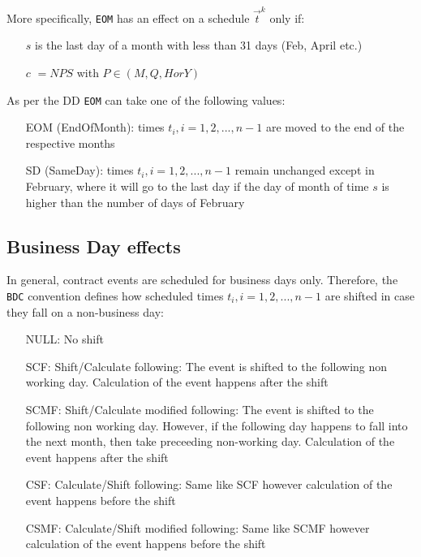 \documentclass[9pt,oneside]{amsart}
\newcommand{\attr}[1]{\texttt{#1}}
\begin{document}
\begin{multicols}{2}
More specifically, \attr{EOM} has an effect on a schedule $\vec{t}^k$ only if:

\begin{itemize}
	\item[$s$] is the last day of a month with less than 31 days (Feb, April etc.)

	\item[$c$] $=NPS$ with $P\in(M, Q, H or Y)$
\end{itemize}

As per the DD \attr{EOM} can take one of the following values:
\begin{itemize}
	\item[EOM] (EndOfMonth): times $t_i,i=1,2,...,n-1$ are moved to the end of the respective months

	\item[SD] (SameDay): times $t_i,i=1,2,...,n-1$ remain unchanged except in February, where it will go to the last day if the day of month of time $s$ is higher than the number of days of February
\end{itemize}


\subsection{Business Day effects}

In general, contract events are scheduled for business days only. Therefore, the \attr{BDC} convention defines how scheduled times $t_i,i=1,2,...,n-1$ are shifted in case they fall on a non-business day:

\begin{itemize}
	\item[NULL:] No shift

	\item[SCF:] Shift/Calculate following: The event is shifted to the following non working day. Calculation of the event happens after the shift

	\item[SCMF:] Shift/Calculate modified following: The event is shifted to the following non working day. However, if the following day happens to fall into the next month, then take preceeding non-working day. Calculation of the event happens after the shift

	\item[CSF:] Calculate/Shift following: Same like SCF however calculation of the event happens before the shift

	\item[CSMF:] Calculate/Shift modified following: Same like SCMF however calculation of the event happens before the shift


\end{itemize}
\end{multicols}
\end{document}
